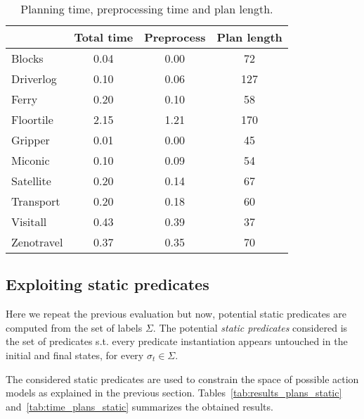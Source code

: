 \documentclass[letterpaper]{article} %
\begin{document}
\begin{table}[hbt!]
\begin{footnotesize}
	\begin{center}
		\begin{tabular}{l|c|c|c|}			
			 & Total time & Preprocess & Plan length  \\
			\hline
			Blocks & 0.04 & 0.00 & 72 \\
			Driverlog & 0.10 & 0.06 & 127 \\
			Ferry & 0.20 & 0.10 & 58 \\
			Floortile & 2.15 & 1.21 & 170 \\
			Gripper & 0.01 & 0.00 & 45 \\
			Miconic & 0.10 & 0.09 & 54 \\
			Satellite & 0.20 & 0.14 & 67 \\
			Transport & 0.20 & 0.18 & 60 \\
			Visitall & 0.43 & 0.39 & 37 \\
			Zenotravel & 0.37 & 0.35 & 70			
		\end{tabular}
	\end{center}
        \end{footnotesize}
	\caption{\small Planning time, preprocessing time and plan length.}
	\label{tab:time_plans}	
\end{table}

\subsection{Exploiting static predicates}
Here we repeat the previous evaluation but now, potential static predicates are computed from the set of labels $\Sigma$. The potential {\em static predicates} considered is the set of predicates s.t. every predicate instantiation appears untouched in the initial and final states, for every $\sigma_t\in\Sigma$.

The considered static predicates are used to constrain the space of possible action models as explained in the previous section.  Tables~\ref{tab:results_plans_static} and~\ref{tab:time_plans_static} summarizes the obtained results.	
\end{document}
